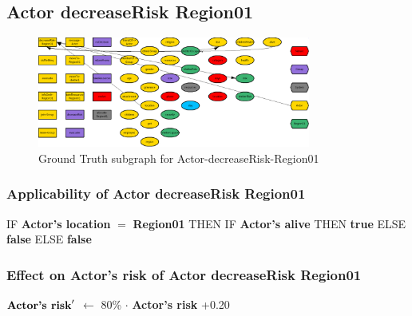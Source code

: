 \documentclass{article}%
\begin{document}
%
\subsection{Actor decreaseRisk Region01}%
\label{subsec:Actor decreaseRisk Region01}%


\begin{figure}[ht]%
\centering%
\includegraphics[width=0.8\textwidth]{images/Actor-decreaseRisk-Region01.png}%
\caption{Ground Truth subgraph for Actor{-}decreaseRisk{-}Region01}%
\end{figure}

%
\subsubsection{Applicability of Actor decreaseRisk Region01}%
\label{ssubsec:Applicability of Actor decreaseRisk Region01}%
\begin{flushleft}%
IF %
\textbf{Actor's location}%
$=$%
\textbf{Region01}%
\linebreak%
\hspace*{2em}%
THEN %
IF %
\textbf{Actor's alive}%
\linebreak%
\hspace*{4em}%
THEN %
\textbf{true}%
\linebreak%
\hspace*{4em}%
ELSE %
\textbf{false}%
\linebreak%
\hspace*{2em}%
ELSE %
\textbf{false}%
\end{flushleft}

%
\subsubsection{Effect on Actor's risk of Actor decreaseRisk Region01}%
\label{ssubsec:Effect on Actor's risk of Actor decreaseRisk Region01}%
\begin{flushleft}%
$\mbox{\textbf{Actor's risk}} '$%
$\leftarrow$%
80\%%
$\cdot$%
\textbf{Actor's risk}%
+0.20%
\end{flushleft}
\end{document}
